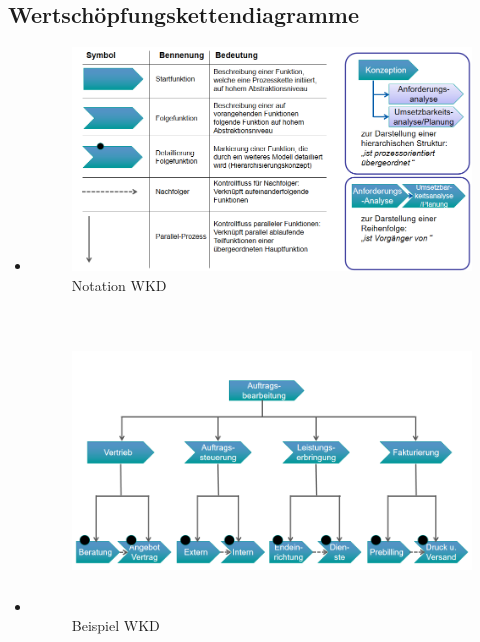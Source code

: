 \documentclass[11pt,a4paper]{article}
\begin{document}
\subsection{Wertschöpfungskettendiagramme}
	\begin{itemize}
	\item[] 
	\begin{figure}[H]
	\includegraphics[width=18cm]{notationwkd} 
	\caption{Notation WKD}
	\end{figure}
	\item[] 
	\begin{figure}[H]
	\includegraphics[height=8cm]{beispielwkd}
	\caption{Beispiel WKD}
	\end{figure}
	\end{itemize}
\end{document}
